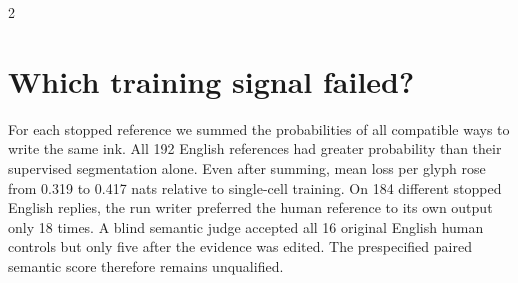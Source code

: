 \begin{multicols}{2}
\section*{Which training signal failed?}
For each stopped reference we summed the probabilities of all compatible ways to write the same ink. All 192 English references had greater probability than their supervised segmentation alone. Even after summing, mean loss per glyph rose from 0.319 to 0.417 nats relative to single-cell training. On 184 different stopped English replies, the run writer preferred the human reference to its own output only 18 times. A blind semantic judge accepted all 16 original English human controls but only five after the evidence was edited. The prespecified paired semantic score therefore remains unqualified.
\end{multicols}
\newpage
